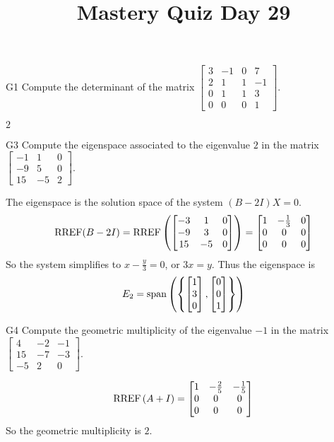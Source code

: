 \documentclass{sbgLAquiz}
\title{Mastery Quiz Day 29 }
\begin{document}
\begin{problem}{G1}
Compute the determinant of the matrix $\begin{bmatrix} 3 & -1 & 0  & 7 \\ 2 & 1 & 1 & -1  \\ 0 & 1 & 1 & 3 \\ 0 & 0 & 0 & 1   \end{bmatrix}$.
\end{problem}
\begin{solution}
$2$
\end{solution}

\begin{problem}{G3}
Compute the eigenspace associated to the eigenvalue $2$ in the matrix $\begin{bmatrix} -1 & 1 & 0 \\ -9 & 5 & 0 \\ 15 & -5 & 2 \end{bmatrix}$.
\end{problem}

\begin{solution}
The eigenspace is the solution space of the system $(B-2I)X=0$.
$$\operatorname{RREF}(B-2I)=\operatorname{RREF}\left(\begin{bmatrix} -3 & 1 & 0 \\ -9 & 3 & 0 \\ 15 & - 5 & 0 \end{bmatrix} \right) = \begin{bmatrix} 1 & -\frac{1}{3} & 0 \\ 0 & 0 & 0 \\ 0 & 0 & 0 \end{bmatrix}$$
So the system simplifies to $x-\frac{y}{3}=0$, or $3x=y$.  Thus the eigenspace is $$E_2 = {\rm span}\left( \left\{ \begin{bmatrix} 1 \\ 3 \\ 0 \end{bmatrix}, \begin{bmatrix} 0 \\ 0 \\ 1\end{bmatrix} \right\} \right)$$
\end{solution}
\begin{extract}\newpage\end{extract}
\begin{problem}{G4}
Compute the geometric multiplicity of the eigenvalue $-1$ in the matrix $\begin{bmatrix} 4 & -2 & -1 \\ 15 & -7 & -3 \\ -5 & 2 & 0 \end{bmatrix}$.  \end{problem}
\begin{solution}
$$\operatorname{RREF}\left(A+I\right) = \begin{bmatrix} 1 & - \frac{2}{5} & -\frac{1}{5} \\ 0 & 0 & 0 \\ 0 & 0 & 0 \end{bmatrix}$$
So the geometric multiplicity is $2$.
\end{solution}
\end{document}
